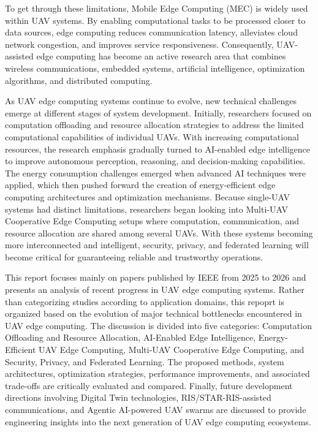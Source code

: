 \documentclass[a4paper, 12pt]{article}
\begin{document}
To get through these limitations, Mobile Edge Computing (MEC) is widely used within UAV systems. By enabling computational tasks to be processed closer to data sources, edge computing reduces communication latency, alleviates cloud network congestion, and improves service responsiveness. Consequently, UAV-assisted edge computing has become an active research area that combines wireless communications, embedded systems, artificial intelligence, optimization algorithms, and distributed computing.

As UAV edge computing systems continue to evolve, new technical challenges emerge at different stages of system development. Initially, researchers focused on computation offloading and resource allocation strategies to address the limited computational capabilities of individual UAVs. With increasing computational resources, the research emphasis gradually turned to AI-enabled edge intelligence to improve autonomous perception, reasoning, and decision-making capabilities. The energy consumption challenges emerged when advanced AI techniques were applied, which then pushed forward the creation of energy-efficient edge computing architectures and optimization mechanisms. Because single-UAV systems had distinct limitations, researchers began looking into Multi-UAV Cooperative Edge Computing setups where computation, communication, and resource allocation are shared among several UAVs. With these systems becoming more interconnected and intelligent, security, privacy, and federated learning will become critical for guaranteeing reliable and trustworthy operations.

This report focuses mainly on papers published by IEEE from 2025 to 2026 and presents an analysis of recent progress in UAV edge computing systems. Rather than categorizing studies according to application domains, this repoprt is organized based on the evolution of major technical bottlenecks encountered in UAV edge computing. The discussion is divided into five categories: Computation Offloading and Resource Allocation, AI-Enabled Edge Intelligence, Energy-Efficient UAV Edge Computing, Multi-UAV Cooperative Edge Computing, and Security, Privacy, and Federated Learning. The proposed methods, system architectures, optimization strategies, performance improvements, and associated trade-offs are critically evaluated and compared. Finally, future development directions involving Digital Twin technologies, RIS/STAR-RIS-assisted communications, and Agentic AI-powered UAV swarms are discussed to provide engineering insights into the next generation of UAV edge computing ecosystems.
\end{document}
